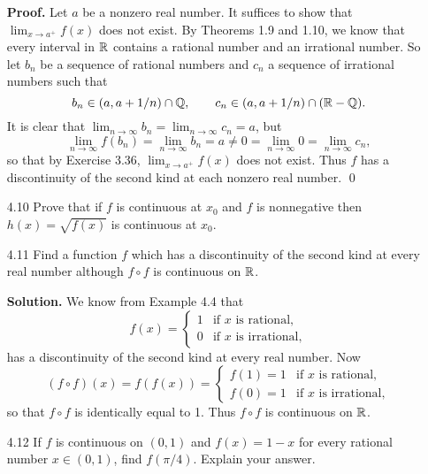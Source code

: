 \begin{enumerate}
      \textbf{Proof.} Let $a$ be a nonzero real number. It suffices to show that
      $\lim_{x\rightarrow a^+} f(x)$ does not exist. By Theorems 1.9 and 1.10,
      we know that every interval in $\mathbb{R}$ contains a rational number and an
      irrational number. So let $b_n$ be a sequence of rational numbers and
      $c_n$ a sequence of irrational numbers such that
      $$b_n \in (a, a + 1/n) \cap \mathbb{Q}, \qquad
        c_n \in (a, a + 1/n) \cap (\mathbb{R} - \mathbb{Q}).$$
      It is clear that
      $\lim_{n\rightarrow\infty}b_n = \lim_{n\rightarrow\infty}c_n = a$, but
      $$\lim_{n\rightarrow\infty}f(b_n) = \lim_{n\rightarrow\infty}b_n = a
        \neq 0 = \lim_{n\rightarrow\infty}0 = \lim_{n\rightarrow\infty}c_n,$$
      so that by Exercise 3.36, $\lim_{x\rightarrow a^+} f(x)$ does not exist.
      Thus $f$ has a discontinuity of the second kind at each nonzero real
      number. \qed
   \item[4.10] Prove that if $f$ is continuous at $x_0$ and $f$ is nonnegative
               then $h(x) = \sqrt{f(x)}$ is continuous at $x_0$.
   \item[4.11] Find a function $f$ which has a discontinuity of the second kind
               at every real number although $f \circ f$ is continuous on $\mathbb{R}$.

      \textbf{Solution.} We know from Example 4.4 that
      \begin{equation*}
         f(x) = \begin{cases}
            1    & \text{if $x$ is rational}, \\
            0    & \text{if $x$ is irrational},
         \end{cases}
      \end{equation*}
      has a discontinuity of the second kind at every real number. Now
      \begin{equation*}
         (f \circ f)(x) = f(f(x)) = \begin{cases}
            f(1) = 1    & \text{if $x$ is rational}, \\
            f(0) = 1    & \text{if $x$ is irrational},
         \end{cases}
      \end{equation*}
      so that $f \circ f$ is identically equal to 1. Thus $f \circ f$ is 
      continuous on $\mathbb{R}$.
   \item[4.12] If $f$ is continuous on $(0, 1)$ and $f(x) = 1 - x$ for every
               rational number $x \in (0, 1)$, find $f(\pi/4)$. Explain your
               answer.


\end{enumerate}

